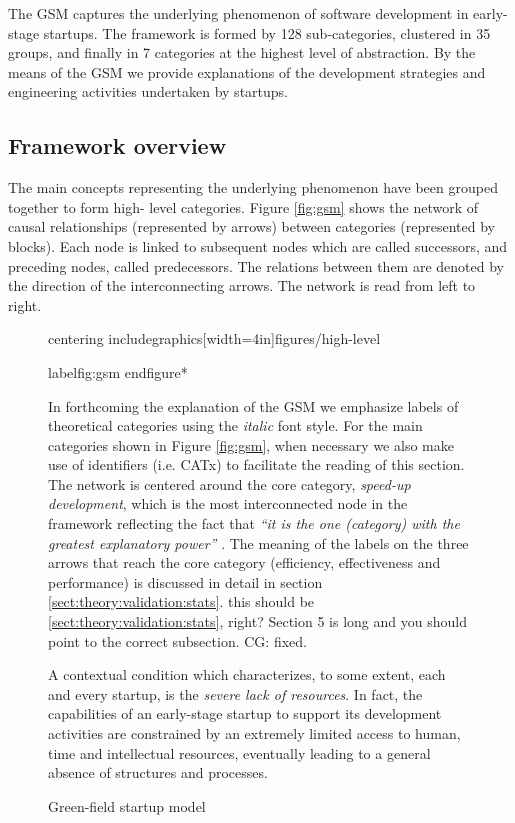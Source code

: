 \documentclass[12pt,journal,compsoc]{../sty/IEEEtran}
\let\MYoriglatexcaption\caption %
\renewcommand{\caption}[2][\relax]{\MYoriglatexcaption[#2]{#2}} %
\begin{document}
\begin{table}[!t]
The GSM captures the underlying phenomenon of software development in  early-
stage startups. The framework is formed by 128 sub-categories, clustered  in 35
groups, and finally in 7 categories at the highest level of abstraction.  By the
means of the GSM we provide explanations of the development strategies  and
engineering activities undertaken by startups.
\subsection{Framework overview} \label{res:gsm:frmov} The main concepts
representing the underlying phenomenon have been grouped  together to form high-
level categories. Figure \ref{fig:gsm} shows the network  of causal
relationships (represented by arrows) between categories (represented  by
blocks). Each node is linked to subsequent nodes which are called successors,
and preceding nodes, called predecessors. The relations between them are denoted
by the direction of the interconnecting arrows. The network is read from left to
right.

\begin{figure}[!t] centering includegraphics[width=4in]{figures/high-level}
\caption{Green-field startup model}label{fig:gsm} end{figure*}

In forthcoming the explanation of the GSM we emphasize labels of theoretical
categories using the \textit{italic} font style. For the main categories shown
in Figure \ref{fig:gsm}, when necessary we also make use of identifiers (i.e.
CATx) to facilitate the reading of this section. The network is centered around
the core category, \textit{speed-up  development}, which is the most
interconnected node in the framework reflecting  the fact that \textit{``it is
the one (category) with the greatest explanatory  power''}  \cite{Strauss1998}.
The meaning of the labels on the three arrows that  reach the core category
(efficiency, effectiveness and performance) is discussed  in detail in section
\ref{sect:theory:validation:stats}. %
this should be \ref{sect:theory:validation:stats}, right? Section 5 is  %
long and you should point to the correct subsection. CG: fixed.

A contextual condition which characterizes, to some extent, each and every
startup, is the \textit{severe lack of resources}. In fact, the capabilities of
an early-stage startup to support its development activities are constrained by
an extremely limited access to human, time and intellectual resources,
eventually leading to a general absence of structures and processes.


\end{figure}
\end{table}
\end{document}
